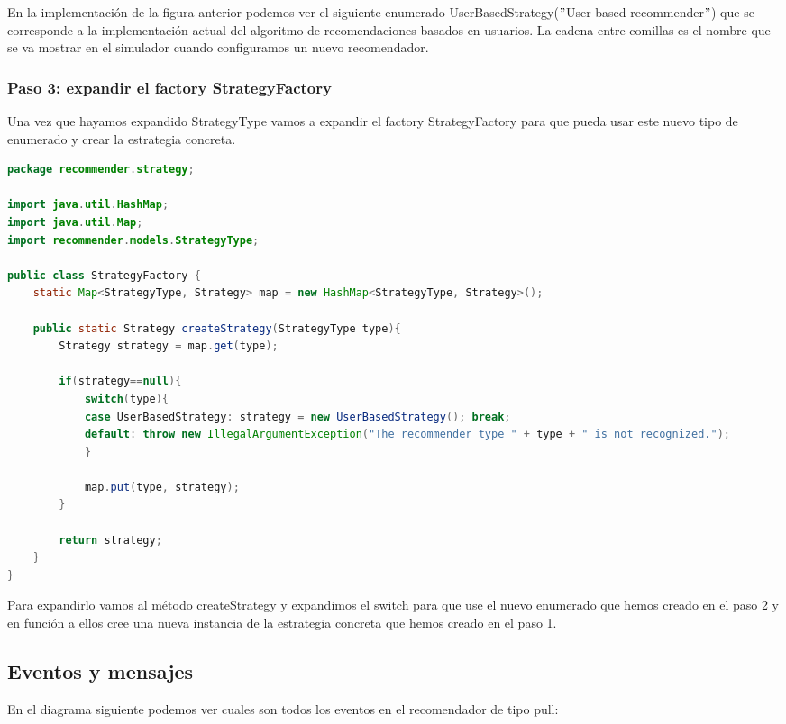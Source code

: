 En la implementación de la figura anterior podemos ver el siguiente enumerado UserBasedStrategy($"$User based recommender$"$) que se corresponde a la implementación actual del algoritmo de recomendaciones basados en usuarios. La cadena entre comillas es el nombre que se va mostrar en el simulador cuando configuramos un nuevo recomendador.

\subsubsection{Paso 3: expandir el factory StrategyFactory}

Una vez que hayamos expandido StrategyType vamos a expandir el factory StrategyFactory para que pueda usar este nuevo tipo de enumerado y crear la estrategia concreta.

\begin{lstlisting}[language=java, frame=single]
package recommender.strategy;

import java.util.HashMap;
import java.util.Map;
import recommender.models.StrategyType;

public class StrategyFactory {
	static Map<StrategyType, Strategy> map = new HashMap<StrategyType, Strategy>();
	
	public static Strategy createStrategy(StrategyType type){
		Strategy strategy = map.get(type);
		
		if(strategy==null){
			switch(type){
			case UserBasedStrategy: strategy = new UserBasedStrategy(); break;
			default: throw new IllegalArgumentException("The recommender type " + type + " is not recognized.");
			}
			
			map.put(type, strategy);
		}
		
		return strategy;
	}
}
\end{lstlisting}

Para expandirlo vamos al método createStrategy y expandimos el switch para que use el nuevo enumerado que hemos creado en el paso 2 y en función a ellos cree una nueva instancia de la estrategia concreta que hemos creado en el paso 1. 

\subsection{Eventos y mensajes}

En el diagrama siguiente podemos ver cuales son todos los eventos en el recomendador de tipo pull:

